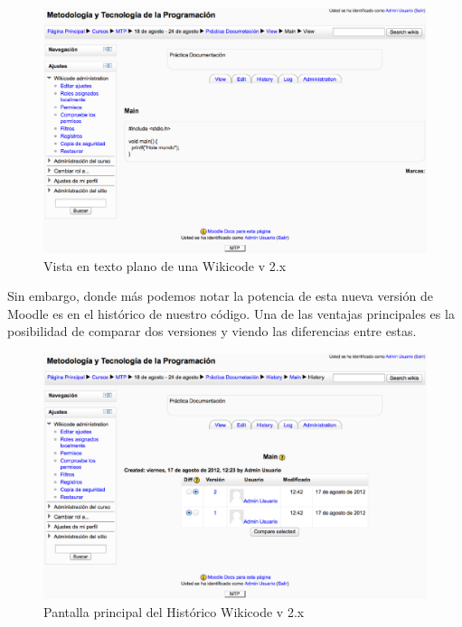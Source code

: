 \vspace{1cm}

\begin{figure}[h]
	\label{v2view.eps}
	\includegraphics[width=\textwidth]{./img/v2view.eps}
	\caption{Vista en texto plano de una Wikicode v 2.x}
\end{figure}

\newpage

Sin embargo, donde más podemos notar la potencia de esta nueva versión de Moodle es en el histórico de nuestro código. Una de las ventajas principales es la posibilidad de comparar dos versiones y viendo las diferencias entre estas.

\vspace{1cm}

\begin{figure}[h]
	\label{v2history1.eps}
	\includegraphics[width=\textwidth]{./img/v2history1.eps}
	\caption{Pantalla principal del Histórico Wikicode v 2.x}
\end{figure}

